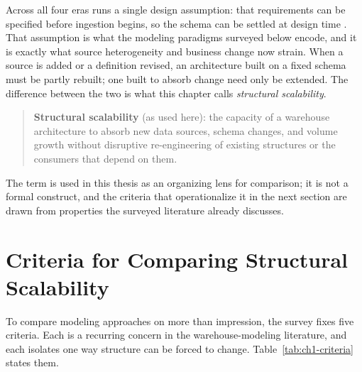 Across all four eras runs a single design assumption: that requirements can be specified before ingestion begins, so the schema can be settled at design time \parencite{golfarelli2009}. That assumption is what the modeling paradigms surveyed below encode, and it is exactly what source heterogeneity and business change now strain. When a source is added or a definition revised, an architecture built on a fixed schema must be partly rebuilt; one built to absorb change need only be extended. The difference between the two is what this chapter calls \textit{structural scalability}.

\begin{quote}
\textbf{Structural scalability} (as used here): the capacity of a warehouse architecture to absorb new data sources, schema changes, and volume growth without disruptive re-engineering of existing structures or the consumers that depend on them.
\end{quote}

\noindent The term is used in this thesis as an organizing lens for comparison; it is not a formal construct, and the criteria that operationalize it in the next section are drawn from properties the surveyed literature already discusses.

\section{Criteria for Comparing Structural Scalability}
\label{sec:ch1-criteria}

To compare modeling approaches on more than impression, the survey fixes five criteria. Each is a recurring concern in the warehouse-modeling literature, and each isolates one way structure can be forced to change. Table~\ref{tab:ch1-criteria} states them.

